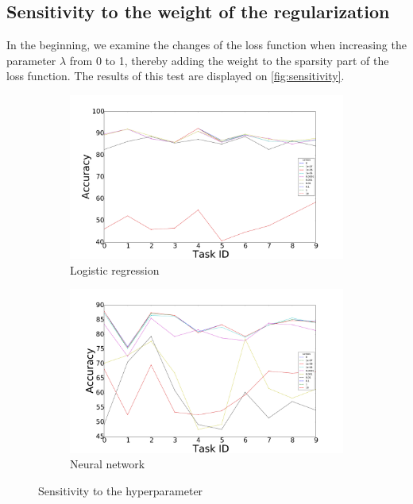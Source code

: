 \documentclass{llncs}
\begin{document}
\subsection{Sensitivity to the weight of the regularization}

In the beginning, we examine the changes of the loss function when increasing the parameter $\lambda$ from 0 to 1, thereby adding the weight to the sparsity part of the loss function. The results of this test are displayed on \autoref{fig:sensitivity}.

\begin{figure}[!htb]
    \centering
    \begin{subfigure}[b]{0.45\textwidth}
        \includegraphics[width=\textwidth]{figures/accuracy_lambda}
        \caption{Logistic regression}
    \end{subfigure}
    \begin{subfigure}[b]{0.45\textwidth}
        \includegraphics[width=\textwidth]{figures/accuracy_lambda_mlp}
        \caption{Neural network}
    \end{subfigure} 
  \caption{Sensitivity to the hyperparameter}
  \label{fig:sensitivity}
\end{figure}
\end{document}
